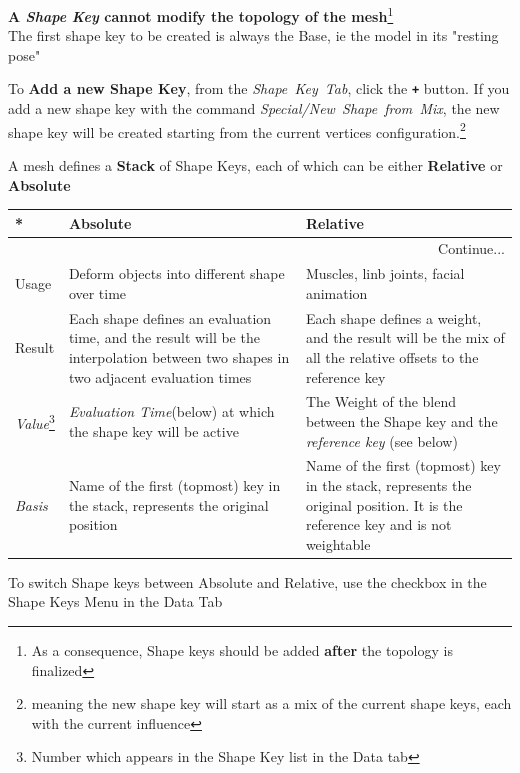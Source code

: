 \documentclass{article}
\begin{document}
\begin{center}
    \textbf{A \textit{Shape Key} cannot modify the topology of the mesh}\footnote{As a consequence, Shape keys should be added \textbf{after} the topology is finalized}\\
    The first shape key to be created is always the Base, ie the model in its "resting pose"
\end{center}
To \textbf{Add a new Shape Key}, from the \mbox{\textit{Shape Key Tab}}, click the \texttt{\textbf{+}} button. If you add a new shape key with the command 
\mbox{\textit{Special/New Shape from Mix}}, the new shape key will be created starting from the current vertices configuration.\footnote{meaning the new shape key will start as a mix of the current shape keys, each with the current influence}\par
A mesh defines a \textbf{Stack} of Shape Keys, each of which can be either \textbf{Relative} or \textbf{Absolute}
\begin{longtable}{p{}|p{}p{}}
    \toprule
    \textbf{*} & \textbf{Absolute} & \textbf{Relative} \\
    \midrule
    \endhead
    \midrule
    \multicolumn{3}{r}{Continue...} \\
    \bottomrule
    \endfoot
    \bottomrule
    \endlastfoot

    Usage & Deform objects into different shape over time & Muscles, linb joints, facial animation \\
    Result & Each shape defines an evaluation time, and the result will be the interpolation between two shapes in two adjacent evaluation times & Each shape defines a weight, and the result will be the mix of all the relative offsets to the reference key \\
    \textit{Value}\footnote{Number which appears in the Shape Key list in the Data tab} & \textit{Evaluation Time}{\tiny(below)} at which the shape key will be active & The Weight of the blend between the Shape key and the \textit{reference key} {\tiny (see below)} \\
    \textit{Basis} & Name of the first (topmost) key in the stack, represents the original position & Name of the first (topmost) key in the stack, represents the original position. It is the reference key and is not weightable \\
\end{longtable}
To switch Shape keys between Absolute and Relative, use the checkbox in the Shape Keys Menu in the Data Tab
\end{document}
